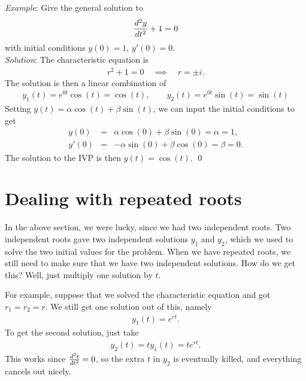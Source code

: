 \documentclass{book}
\begin{document}
\noindent\emph{Example}: Give the general solution to
\begin{align*}
\frac{d^2 y}{d t^2} + 1 =0
\end{align*}
with initial conditions $y(0) =1, \, y'(0) =0.$\\
\noindent\emph{Solution}:
The characteristic equation is
\begin{align*}
r^2 +1 =0 \quad \implies \quad r = \pm i.
\end{align*}
The solution is then a linear combination of
\begin{align*}
y_1(t) = e^{0t}\cos(t) = \cos(t), \qquad
y_2(t) = e^{0t}\sin(t) = \sin(t)
\end{align*}
Setting $y(t)=\alpha \cos(t) + \beta \sin(t)$, we can input the initial
conditions to get
\begin{align*}
y(0) &=& \alpha\cos(0) + \beta\sin(0) = \alpha =1,
\\
y'(0) &=& -\alpha\sin(0) + \beta\cos(0) =\beta =0.
\end{align*}
The solution to the IVP is then $y(t) = \cos(t)$. \qed

\section{Dealing with repeated roots}
In the above section, we were lucky, since we had two independent roots.
Two independent roots gave two independent solutions $y_1$ and $y_2$, which
we used to solve the two initial values for the problem. When we have
repeated roots, we still need to make sure that we have two independent
solutions. How do we get this? Well, just multiply one solution by $t$.

For example, suppose that we solved the characteristic equation and got
$r_1=r_2=r$. We still get one solution out of this, namely
\begin{align*}
y_1(t) =e^{rt}.
\end{align*}
To get the second solution, just take
\begin{align*}
y_2(t) = t y_1(t) = t e^{rt}.
\end{align*}
This works since $\frac{d^2 t}{d t^2}=0$, so the extra $t$ in $y_2$ is eventually
killed, and everything cancels out nicely.
\\
\end{document}
